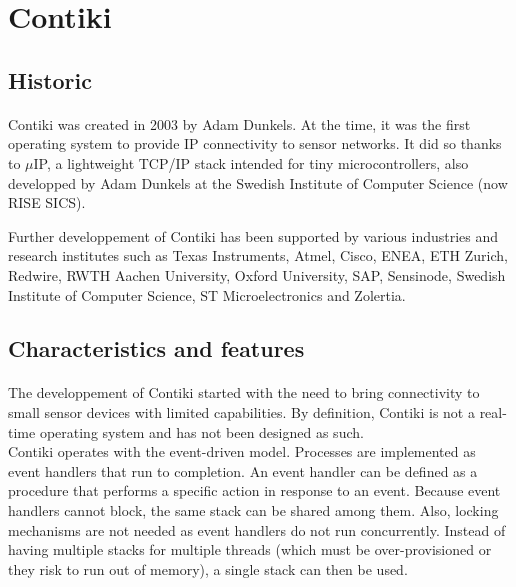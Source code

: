 \section{Contiki}

\subsection{Historic}
\paragraph{}
Contiki was created in 2003 by Adam Dunkels. %
At the time, it was the first operating system to provide IP connectivity to sensor networks.
It did so thanks to $\mu$IP, a lightweight TCP/IP stack intended for tiny microcontrollers,
    also developped by Adam Dunkels at the Swedish Institute of Computer Science (now RISE SICS).%

Further developpement of Contiki has been supported by various industries and research institutes 
    such as Texas Instruments, Atmel, Cisco, ENEA, ETH Zurich, Redwire, RWTH Aachen University, 
    Oxford University, SAP, Sensinode, Swedish Institute of Computer Science, ST Microelectronics and Zolertia.

\subsection{Characteristics and features}
\paragraph{}
The developpement of Contiki started with the need to bring connectivity to small sensor devices with limited capabilities.
By definition, Contiki is not a real-time operating system and has not been designed as such.\\

Contiki operates with the event-driven model.
Processes are implemented as event handlers that run to completion.
An event handler can be defined as a procedure that performs a specific action in response to an event.
Because event handlers cannot block, the same stack can be shared among them.
Also, locking mechanisms are not needed as event handlers do not run concurrently.
Instead of having multiple stacks for multiple threads (which must be over-provisioned or they risk to run out of memory), a single stack can then be used.

